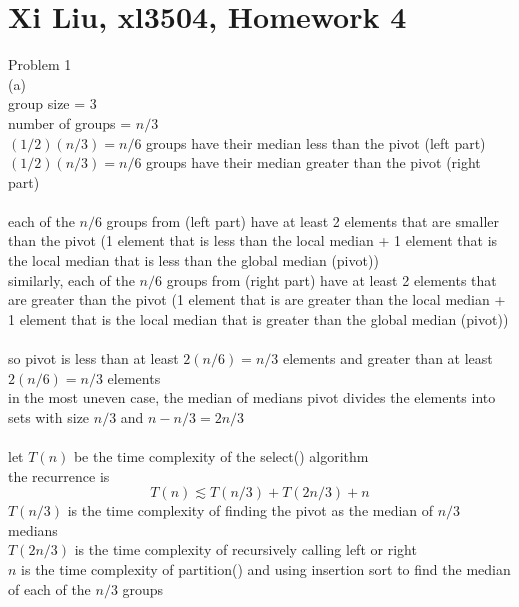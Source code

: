 \documentclass[12pt,border=4pt,multi]{article}%
\begin{document}
\section*{Xi Liu, xl3504, Homework 4}
Problem 1\\
(a)\\
group size = 3\\
number of groups = $n/3$\\
$(1/2)(n/3) = n/6$ groups have their median less than the pivot	(left part)\\
$(1/2)(n/3) = n/6$ groups have their median greater than the pivot	(right part)\\
\\
each of the $n/6$ groups from (left part)
have at least 2 elements that are smaller than the pivot
(1 element that is less than the local median + 1 element that is the local median 
that is less than the global median (pivot))
\\
similarly,
each of the $n/6$ groups from (right part)
have at least 2 elements that are greater than the pivot
(1 element that is are greater than the local median + 1 element that is the local median 
that is greater than the global median (pivot))\\
\\
so pivot is less than at least $2(n/6) = n/3$ elements 
and greater than at least $2(n/6) = n/3$ elements
\\
in the most uneven case, the median of medians pivot divides the elements into sets with size $n/3$ and $n - n/3 = 2n/3$\\
\\
let $T(n)$ be the time complexity of the select() algorithm\\
the recurrence is 
\[\boxed{T(n) \lesssim T(n/3) + T(2n/3) + n}\]
$T(n/3)$ is the time complexity of finding the pivot as the median of $n/3$ medians\\
$T(2n/3)$ is the time complexity of recursively calling left or right\\
$n$ is the time complexity of partition() and using insertion sort to find the median of each of the $n/3$ groups\\ 
\\
\end{document}
